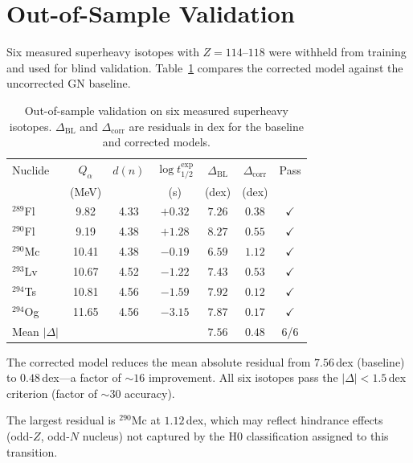 \documentclass[12pt,a4paper,twocolumn]{revtex4-2}
\newcommand{\thalf}{t_{1/2}}
\newcommand{\Qalpha}{Q_\alpha}
\newcommand{\dn}{d(n)}
\begin{document}
\section{Out-of-Sample Validation}
\label{sec:oos}

Six measured superheavy isotopes with $Z = 114$--$118$ were
withheld from training and used for blind validation.
Table~\ref{tab:oos} compares the corrected model against the
uncorrected GN baseline.

\begin{table}[h]
\centering
\caption{Out-of-sample validation on six measured superheavy
  isotopes.  $\Delta_{\mathrm{BL}}$ and $\Delta_{\mathrm{corr}}$
  are residuals in dex for the baseline and corrected models.}
\label{tab:oos}
\begin{tabular}{@{}lcccccc@{}}
\toprule
Nuclide & $\Qalpha$ & $\dn$ & $\log\thalf^{\mathrm{exp}}$ &
  $\Delta_{\mathrm{BL}}$ & $\Delta_{\mathrm{corr}}$ & Pass \\
  & (MeV) & & (s) & (dex) & (dex) & \\
\midrule
${}^{289}$Fl & 9.82 & 4.33 & $+0.32$ & $7.26$ & $0.38$ & $\checkmark$ \\
${}^{290}$Fl & 9.19 & 4.38 & $+1.28$ & $8.27$ & $0.55$ & $\checkmark$ \\
${}^{290}$Mc & 10.41 & 4.38 & $-0.19$ & $6.59$ & $1.12$ & $\checkmark$ \\
${}^{293}$Lv & 10.67 & 4.52 & $-1.22$ & $7.43$ & $0.53$ & $\checkmark$ \\
${}^{294}$Ts & 10.81 & 4.56 & $-1.59$ & $7.92$ & $0.12$ & $\checkmark$ \\
${}^{294}$Og & 11.65 & 4.56 & $-3.15$ & $7.87$ & $0.17$ & $\checkmark$ \\
\midrule
Mean $|\Delta|$ & & & & $7.56$ & $0.48$ & 6/6 \\
\bottomrule
\end{tabular}
\end{table}

The corrected model reduces the mean absolute residual from
$7.56$\,dex (baseline) to $0.48$\,dex---a factor of
$\sim 16$ improvement.  All six isotopes pass the
$|\Delta| < 1.5$\,dex criterion (factor of $\sim 30$
accuracy).

The largest residual is ${}^{290}$Mc at $1.12$\,dex, which may
reflect hindrance effects (odd-$Z$, odd-$N$ nucleus) not captured
by the H0 classification assigned to this transition.
\end{document}
